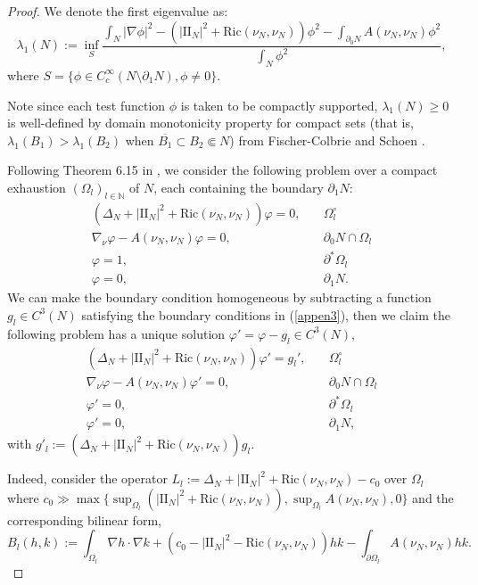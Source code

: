 \documentclass[12pt]{amsart}
\newcommand{\N}{\mathbb N}
\newcommand{\sff}{\mathrm{I\!I}}
\newcommand{\Ric}{\text{Ric}}
\newcommand{\p}{\partial}
\numberwithin{equation}{section}
\begin{document}
\begin{proof}
		We denote the first eigenvalue as:
		\begin{equation*}
			\lambda_1(N):=\inf_S \frac{\int_N |\nabla \phi|^2-(|\sff_N|^2 +\Ric(\nu_N,\nu_N))\phi^2-\int_{\p_0 N}A(\nu_N,\nu_N)\phi^2}{\int_N \phi^2},
		\end{equation*}
		where $S=\{\phi \in C^{\infty}_c({ N \setminus \p_1 N}), \phi\neq 0\}$.
		
		Note since each test function $\phi$ is taken to be compactly supported, $\lambda_1(N)\geq 0$ is well-defined by domain monotonicity property for compact sets (that is, $\lambda_1(B_1) > \lambda_1(B_2) $ when $\overline{B_1}\subset B_2 \Subset N $) from Fischer-Colbrie and Schoen \cite{FischSchoe1980-StructureCompleteStable}.

	
		
		Following Theorem 6.15 in \cite{GilbaTrudi2001-EllipticPartialDifferential}, we consider the following problem over a compact exhaustion $(\Omega_l)_{l\in \N}$ of $N$, each containing the boundary $\partial_1 N$:
		\begin{align} \label{appen3}
			(\Delta_N +|\sff_N|^2+\Ric(\nu_N,\nu_N))\varphi=0, \quad & \Omega_l^{\circ}  \\
			\nabla_{\nu}\varphi-A(\nu_N,\nu_N)\varphi=0, \quad & \partial_0 N \cap  \Omega_l\nonumber\\ 
			\varphi=1, \quad & \partial^{*} \Omega_l\nonumber\\
			\varphi=0, \quad & \partial_1 N.\nonumber
		\end{align}
		We can make the boundary condition homogeneous by subtracting a function $g_l\in C^3(N)$ satisfying the boundary conditions in (\ref{appen3}), then we claim the following problem has a unique solution $\varphi'=\varphi-g_l\in C^3(N)$, 
	\begin{align} \label{appen4}
			(\Delta_N +|\sff_N|^2+\Ric(\nu_N,\nu_N))\varphi'=g_l', \quad & \Omega_l^{\circ}  \\
			\nabla_{\nu}\varphi-A(\nu_N,\nu_N)\varphi'=0, \quad & \partial_0 N \cap  \Omega_l\nonumber\\ 
			\varphi'=0, \quad & \partial^{*} \Omega_l\nonumber\\
			\varphi'=0, \quad & \partial_1 N,\nonumber
		\end{align}
		with $g'_l:=(\Delta_N+|\sff_N|^2+\Ric(\nu_N,\nu_N))g_l.$


	Indeed, consider the operator $L_l:=\Delta_N+|\sff_N|^2+\Ric(\nu_N,\nu_N)-c_0$ over $\Omega_l$ where $c_0 \gg \max\{\sup_{\Omega_l}(|\sff_N|^2+\Ric(\nu_N,\nu_N)),\sup_{\Omega_l} A(\nu_N,\nu_N),0\}$ and the corresponding bilinear form, 
	\begin{equation*}
		B_l(h,k):=\int_{\Omega_l} \nabla h\cdot \nabla k+(c_0-|\sff_N|^2-\Ric(\nu_N,\nu_N))hk-\int_{\p \Omega_l}A(\nu_N,\nu_N)hk.
	\end{equation*}



\end{proof}
\end{document}
